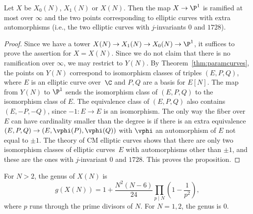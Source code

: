 \documentclass{report}
\begin{document}
\begin{proposition}\label{prop:ramified}
Let $X$ be $X_0(N)$, $X_1(N)$ or $X(N)$.  Then the map $X\to \P^1$
is ramified at most over $\infty$ and the two points corresponding
to elliptic curves with extra automorphisms (i.e., the two
elliptic curves with $j$-invariants $0$ and $1728$).
\end{proposition}
\begin{proof}
Since we have a tower $X(N)\to X_1(N)\to X_0(N)\to \P^1$, it
suffices to prove the assertion for $X=X(N)$.  Since we do not
claim that there is no ramification over $\infty$, we may restrict
to $Y(N)$.  By Theorem~\ref{thm:paramcurves}, the points on $Y(N)$
correspond to isomorphism classes of triples $(E,P,Q)$, where $E$
is an elliptic curve over~$\C$ and $P,Q$ are a basis for $E[N]$.
The map from $Y(N)$ to $\P^1$ sends the isomorphism class of
$(E,P,Q)$ to the isomorphism class of $E$.  The equivalence class
of $(E,P,Q)$ also contains $(E,-P,-Q)$, since $-1:E\to E$ is an
isomorphism.   The only way the fiber over $E$ can have
cardinality smaller than the degree is if there is an extra
equivalence $(E,P,Q) \to (E,\vphi(P),\vphi(Q))$ with $\vphi$ an
automorphism of $E$ not equal to $\pm 1$.   The theory of CM
elliptic curves shows that there are only two isomorphism classes
of elliptic curves~$E$ with automorphisms other than $\pm1$, and
these are the ones with $j$-invariant $0$ and $1728$.  This proves
the proposition.
\end{proof}


\begin{theorem}
%
%
For $N>2$, the genus of $X(N)$ is
\[
  g(X(N)) = 1 + \frac{N^2(N-6)}{24}\prod_{p\mid N}\left(1-\frac{1}{p^2}\right),
\]
where $p$ runs through the prime divisors of $N$.
For $N=1,2$, the genus is $0$.
\end{theorem}
\end{document}
